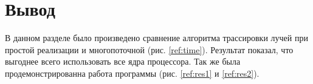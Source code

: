 \begin{figure}[ht!]
\end{figure}

\section{Вывод}

В данном разделе было произведено сравнение алгоритма трассировки лучей
при простой реализации и многопоточной (рис. \ref{ref:time}).
Результат показал, что выгоднее всего использовать все ядра процессора.
Так же была продемонстрированна работа программы (рис. \ref{ref:res1} и \ref{ref:res2}).